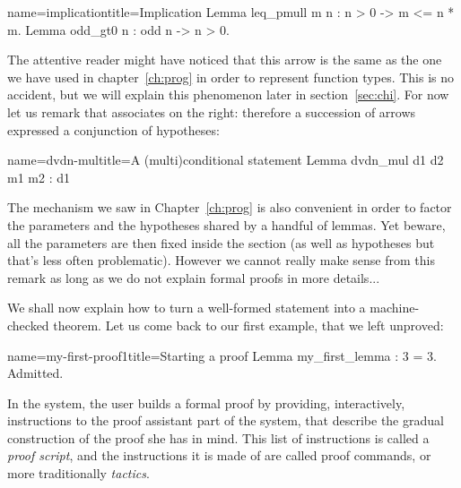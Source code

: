 \begin{coq}{name=implication}{title=Implication}
Lemma leq_pmull m n : n > 0 -> m <= n * m.
Lemma odd_gt0 n : odd n -> n > 0.
\end{coq}

The attentive reader might have noticed that this arrow \C{->} is the
same as the one we have used in chapter~\ref{ch:prog} in order to
represent function types. This is no accident, but we will explain
this phenomenon later in section~\ref{sec:chi}. For now let us remark
that \C{->} associates on the right: therefore a succession of arrows
expressed a conjunction of hypotheses:

\begin{coq}{name=dvdn-mul}{title=A (multi)conditional statement}
Lemma dvdn_mul d1 d2 m1 m2 : d1 %
\end{coq}


The  mechanism we saw in Chapter~\ref{ch:prog} is also
convenient in order to factor the parameters and the hypotheses shared
by a handful of lemmas. Yet beware, all the parameters are then fixed
inside the section (as well as hypotheses but that's less often
problematic). However we cannot really make sense from this remark as
long as we do not explain formal proofs in more details...


We shall now explain how to turn a well-formed statement into a
machine-checked theorem. Let us come back to our first example, that
we left unproved:
\begin{coq}{name=my-first-proof1}{title=Starting a proof}
Lemma my_first_lemma : 3 = 3.
Admitted.
\end{coq}
In the \Coq{} system, the user builds a formal proof by providing,
interactively, instructions to the proof assistant part of the \Coq{}
system, that describe the gradual construction of the proof she has in
mind. This list of instructions is called a \emph{proof script}, and
the instructions it is made of are called proof commands, or more traditionally
\emph{tactics}.

